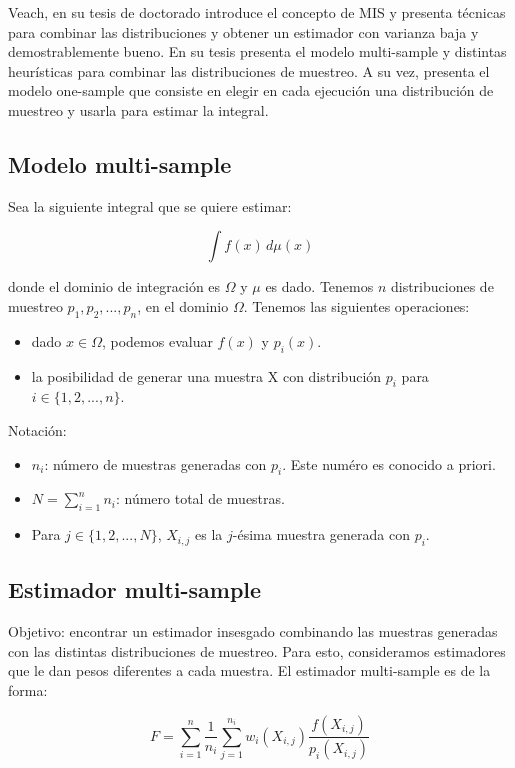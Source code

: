 \documentclass{article}
\begin{document}
Veach, en su tesis de doctorado \cite{Veach1997} introduce el concepto de MIS y presenta técnicas para combinar las distribuciones y obtener un estimador con varianza baja y demostrablemente bueno.
En su tesis presenta el modelo multi-sample y distintas heurísticas para combinar las distribuciones de muestreo.
A su vez, presenta el modelo one-sample que consiste en elegir en cada ejecución una distribución de muestreo y usarla para estimar la integral.

\subsection{Modelo multi-sample}

Sea la siguiente integral que se quiere estimar:

$$ \int f(x) \,d\mu(x)$$

donde el dominio de integración es $\Omega$ y $\mu$ es dado. Tenemos $n$ distribuciones de muestreo $p_{1}, p_{2}, ..., p_{n}$, en el dominio $\Omega$.
Tenemos las siguientes operaciones:
\begin{itemize}
    \item dado $x \in \Omega$, podemos evaluar $f(x)$ y $p_{i}(x)$.
    \item la posibilidad de generar una muestra X con distribución $p_{i}$ para $i \in \{1, 2, ..., n\}$.
\end{itemize}

Notación:
\begin{itemize}
    \item $n_{i}$: número de muestras generadas con $p_{i}$. Este numéro es conocido a priori.
    \item $N = \sum_{i=1}^{n} n_{i}$: número total de muestras.
    \item Para $j \in \{1, 2, ..., N\}$, $X_{i,j}$ es la $j$-ésima muestra generada con $p_{i}$.
\end{itemize}

\subsection{Estimador multi-sample}

Objetivo: encontrar un estimador insesgado combinando las muestras generadas con las distintas distribuciones de muestreo.
Para esto, consideramos estimadores que le dan pesos diferentes a cada muestra.
El estimador multi-sample es de la forma:

$$F = \sum_{i=1}^{n} \frac{1}{n_{i}} \sum_{j=1}^{n_{i}} w_{i}(X_{i,j}) \frac{f(X_{i,j})}{p_{i}(X_{i,j})}$$
\end{document}
